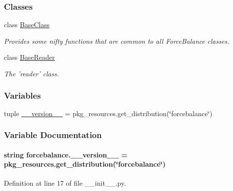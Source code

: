 \subsubsection*{Classes}
\begin{DoxyCompactItemize}
\item 
class \hyperlink{classforcebalance_1_1BaseClass}{Base\-Class}
\begin{DoxyCompactList}\small\item\em Provides some nifty functions that are common to all Force\-Balance classes. \end{DoxyCompactList}\item 
class \hyperlink{classforcebalance_1_1BaseReader}{Base\-Reader}
\begin{DoxyCompactList}\small\item\em The 'reader' class. \end{DoxyCompactList}\end{DoxyCompactItemize}
\subsubsection*{Variables}
\begin{DoxyCompactItemize}
\item 
tuple \hyperlink{namespaceforcebalance_a6c10581ea309550b5703fbe56f62e8a2}{\-\_\-\-\_\-version\-\_\-\-\_\-} = pkg\-\_\-resources.\-get\-\_\-distribution(\char`\"{}forcebalance\char`\"{})
\end{DoxyCompactItemize}


\subsubsection{Variable Documentation}
\hypertarget{namespaceforcebalance_a6c10581ea309550b5703fbe56f62e8a2}{
\paragraph[{\-\_\-\-\_\-version\-\_\-\-\_\-}]{\setlength{\rightskip}{0pt plus 5cm}string forcebalance.\-\_\-\-\_\-version\-\_\-\-\_\- = pkg\-\_\-resources.\-get\-\_\-distribution(\char`\"{}forcebalance\char`\"{})}}\label{namespaceforcebalance_a6c10581ea309550b5703fbe56f62e8a2}


Definition at line 17 of file \-\_\-\-\_\-init\-\_\-\-\_\-.\-py.

